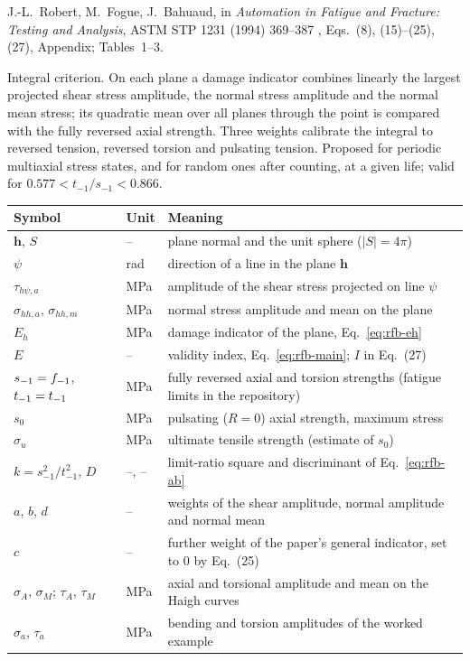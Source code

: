 \label{sheet:RFB}

 J.-L.~Robert, M.~Fogue, J.~Bahuaud, in \emph{Automation in Fatigue and Fracture:
Testing and Analysis}, ASTM STP 1231 (1994) 369--387 \cite{robert1994}, Eqs.~(8), (15)--(25), (27),
Appendix; Tables~1--3.

 Integral criterion. On each plane a damage indicator combines linearly the
largest projected shear stress amplitude, the normal stress amplitude and the normal mean stress;
its quadratic mean over all planes through the point is compared with the fully reversed axial
strength. Three weights calibrate the integral to reversed tension, reversed torsion and pulsating
tension. Proposed for periodic multiaxial stress states, and for random ones after counting, at a
given life; valid for $0.577<t_{-1}/s_{-1}<0.866$.

\begin{center}\small
\begin{tabular}{@{}llp{100mm}@{}}
\toprule
Symbol & Unit & Meaning\\\midrule
$\mathbf h$, $S$ & -- & plane normal and the unit sphere ($\lvert S\rvert=4\pi$)\\
$\psi$ & rad & direction of a line in the plane $\mathbf h$\\
$\tau_{h\psi,a}$ & MPa & amplitude of the shear stress projected on line $\psi$\\
$\sigma_{hh,a}$, $\sigma_{hh,m}$ & MPa & normal stress amplitude and mean on the plane\\
$E_h$ & MPa & damage indicator of the plane, Eq.~\eqref{eq:rfb-eh}\\
$E$ & -- & validity index, Eq.~\eqref{eq:rfb-main}; $I$ in Eq.~(27)\\
$s_{-1}=f_{-1}$, $t_{-1}=t_{-1}$ & MPa & fully reversed axial and torsion strengths (fatigue limits in the repository)\\
$s_0$ & MPa & pulsating ($R=0$) axial strength, maximum stress\\
$\sigma_u$ & MPa & ultimate tensile strength (estimate of $s_0$)\\
$k=s_{-1}^2/t_{-1}^2$, $D$ & --, -- & limit-ratio square and discriminant of Eq.~\eqref{eq:rfb-ab}\\
$a$, $b$, $d$ & -- & weights of the shear amplitude, normal amplitude and normal mean\\
$c$ & -- & further weight of the paper's general indicator, set to 0 by Eq.~(25)\\
$\sigma_A$, $\sigma_M$; $\tau_A$, $\tau_M$ & MPa & axial and torsional amplitude and mean on the Haigh curves\\
$\sigma_a$, $\tau_a$ & MPa & bending and torsion amplitudes of the worked example\\
\bottomrule
\end{tabular}
\end{center}

